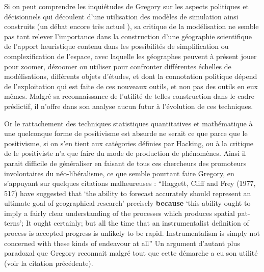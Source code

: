 Si on peut comprendre les inquiétudes de Gregory \textcite{Gregory1978} sur les aspects politiques et décisionnels qui découlent d'une utilisation des modèles de simulation ainsi construits (un débat encore très actuel \autocite{OSullivan2004} ), sa critique de la modélisation ne semble pas tant relever l'importance dans la construction d'une géographie scientifique de l'apport heuristique contenu dans les possibilités de simplification ou complexification de l'espace, avec laquelle les géographes peuvent à présent jouer pour zoomer, dézoomer ou utiliser pour confronter différentes échelles de modélisations, différents objets d'études, et dont la connotation politique dépend de l'exploitation qui est faite de ces nouveaux outils, et non pas des outils en eux mêmes. Malgré sa reconnaissance de l'utilité de telles construction dans le cadre prédictif, il n'offre dans son analyse aucun futur à l'évolution de ces techniques.

Or le rattachement des techniques statistiques quantitatives et mathématique à une quelconque forme de positivisme est absurde ne serait ce que parce que le positivisme, si on s'en tient aux catégories définies par Hacking, ou à la critique de \autocite{Dauphine2003} le positiviste n'a que faire du mode de production de phénomènes. Ainsi il parait difficile de généraliser en faisant de tous ces chercheurs des promoteurs involontaires du néo-libéralisme, ce que semble pourtant faire Gregory, en s'appuyant sur quelques citations malheureuses : \foreignquote{english}{Haggett, Cliff and Frey (1977, 517) have suggested that \foreignquote{english}{the ability to forecast accurately should represent an ultimate goal of geographical research} precisely \textbf{because} \foreignquote{english}{this ability ought to imply a fairly clear understanding of the processes which produces spatial patterns}; It ought certainly; but all the time that an instrumentalist definition of process is accepted progress is unlikely to be rapid. Instrumentalism is simply not concerned with these kinds of endeavour at all} \autocite[41]{Gregory1978} Un argument d'autant plus paradoxal que Gregory reconnait malgré tout que cette démarche a eu son utilité (voir la citation précédente).

